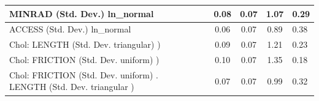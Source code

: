 \begin{table}
\begin{center}
\begin{tabular}{|l|l|c|c|c|l|}
			\hline
			MINRAD (Std. Dev.) ln_normal &  & 0.08 & 0.07 & 1.07 & 0.29 \\
			\hline
			ACCESS (Std. Dev.) ln_normal &  & 0.06 & 0.07 & 0.89 & 0.38 \\
			\hline
			 Chol: LENGTH (Std. Dev. triangular) ) &  & 0.09 & 0.07 & 1.21 & 0.23 \\
			\hline
			 Chol: FRICTION (Std. Dev. uniform) ) &  & 0.10 & 0.07 & 1.35 & 0.18 \\
			\hline
			 Chol: FRICTION (Std. Dev. uniform) . LENGTH (Std. Dev.   triangular ) &  & 0.07 & 0.07 & 0.99 & 0.32 \\
			\hline
		\end{tabular}
	\end{center}
\end{table}